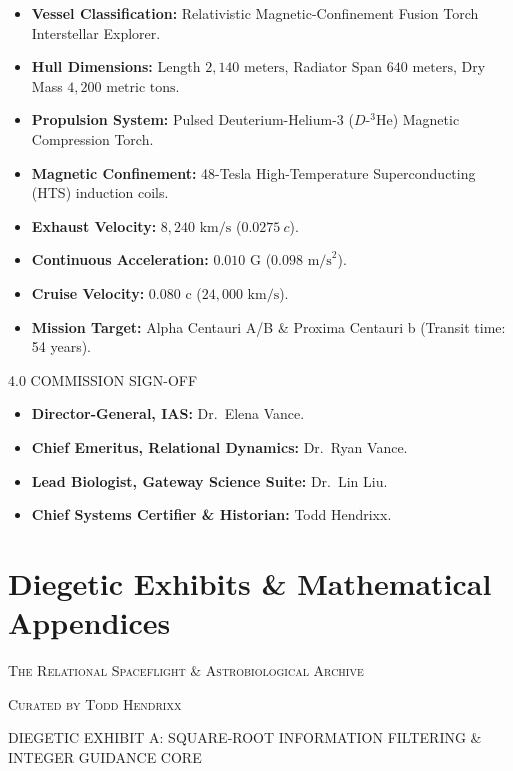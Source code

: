 \documentclass[12pt,twoside,openright]{book}
\newcommand{\sceneheader}[1]{%
  \par\vspace{1.8em}%
  {\noindent\centering\scshape\large #1\par}%
  \vspace{1.0em}%
  \noindent%
}
\newcommand{\dinkus}{%
  \par\vspace{1.2em}%
  {\noindent\centering{\large $\ast\quad\ast\quad\ast$}\par}%
  \vspace{1.2em}%
  \noindent%
}
\providecommand{\tightlist}{\setlength{\itemsep}{0pt}\setlength{\parskip}{0pt}
\setlength{\tabcolsep}{2pt}}
\begin{document}
\begin{itemize}
\tightlist
\item
  \textbf{Vessel Classification:} Relativistic Magnetic-Confinement
  Fusion Torch Interstellar Explorer.
\item
  \textbf{Hull Dimensions:} Length \(2,140\text{ meters}\), Radiator
  Span \(640\text{ meters}\), Dry Mass \(4,200\text{ metric tons}\).
\item
  \textbf{Propulsion System:} Pulsed Deuterium-Helium-3
  (\(D\text{-}^3\text{He}\)) Magnetic Compression Torch.
\item
  \textbf{Magnetic Confinement:} 48-Tesla High-Temperature
  Superconducting (HTS) induction coils.
\item
  \textbf{Exhaust Velocity:} \(8,240 \text{ km/s}\) (\(0.0275\ c\)).
\item
  \textbf{Continuous Acceleration:} \(0.010 \text{ G}\)
  (\(0.098\text{ m/s}^2\)).
\item
  \textbf{Cruise Velocity:} \textbf{\(0.080 \text{ c}\)}
  (\(24,000\text{ km/s}\)).
\item
  \textbf{Mission Target:} Alpha Centauri A/B \& Proxima Centauri b
  (Transit time: 54 years).
\end{itemize}

\dinkus

\sceneheader{4.0 COMMISSION SIGN-OFF}

\begin{itemize}
\tightlist
\item
  \textbf{Director-General, IAS:} Dr.~Elena Vance.
\item
  \textbf{Chief Emeritus, Relational Dynamics:} Dr.~Ryan Vance.
\item
  \textbf{Lead Biologist, Gateway Science Suite:} Dr.~Lin Liu.
\item
  \textbf{Chief Systems Certifier \& Historian:} Todd Hendrixx.
\end{itemize}

\backmatter
\cleardoublepage
\part{Diegetic Exhibits \& Mathematical Appendices}
\sceneheader{The Relational Spaceflight \& Astrobiological
Archive}

\sceneheader{Curated by Todd Hendrixx}

\dinkus

\sceneheader{DIEGETIC EXHIBIT A: SQUARE-ROOT INFORMATION FILTERING \&
INTEGER GUIDANCE
CORE}
\end{document}
